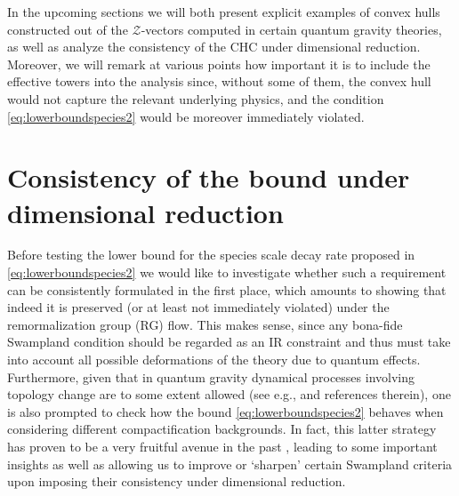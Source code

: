 In the upcoming sections we will both present explicit examples of convex hulls constructed out of the $\mathcal{Z}$-vectors computed in certain quantum gravity theories, as well as analyze the consistency of the CHC under dimensional reduction. Moreover, we will remark at various points how important it is to include the effective towers into the analysis since, without some of them, the convex hull would not capture the relevant underlying physics, and the condition \eqref{eq:lowerboundspecies2} would be moreover immediately violated. %


\section{Consistency of the bound under dimensional reduction}
\label{s:consistencydimreduc}

Before testing the lower bound for the species scale decay rate proposed in \eqref{eq:lowerboundspecies2} we would like to investigate whether such a requirement can be consistently formulated in the first place, which amounts to showing that indeed it is preserved (or at least not immediately violated) under the remormalization group (RG) flow. This makes sense, since any bona-fide Swampland condition should be regarded as an IR constraint and thus must take into account all possible deformations of the theory due to quantum effects. Furthermore, given that in quantum gravity dynamical processes involving topology change are to some extent allowed (see e.g., \cite{McNamara:2019rup} and references therein), one is also prompted to check how the bound \eqref{eq:lowerboundspecies2} behaves when considering different compactification backgrounds. In fact, this latter strategy has proven to be a very fruitful avenue in the past \cite{Heidenreich:2015nta,Rudelius:2021oaz,Etheredge:2022opl}, leading to some important insights as well as allowing us to improve or `sharpen' certain Swampland criteria upon imposing their consistency under dimensional reduction.

